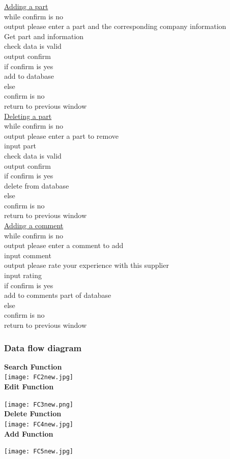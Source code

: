 \underline{Adding a part}\\
while confirm is no\\
output please enter a part and the corresponding company information\\
Get part and information\\
check data is valid\\
output confirm\\
if confirm is yes\\
add to database\\
else \\
confirm is no\\
return to previous window\\

\underline{Deleting a part}\\
while confirm is no\\
output please enter a part to remove\\
input part\\
check data is valid\\
output confirm\\
if confirm is yes\\
delete from database\\
else \\
confirm is no\\
return to previous window\\

\underline{Adding a comment}\\
while confirm is no\\
output please enter a comment to add\\
input comment\\
output please rate your experience with this supplier\\
input rating\\
if confirm is yes\\
add to comments part of database\\
else\\
confirm is no\\
return to previous window\\

\subsubsection{Data flow diagram}
\begin{flushleft}
\textbf{Search Function}\\
\texttt{[image: FC2new.jpg]}\\
\clearpage
\textbf{Edit Function}\\\par
\texttt{[image: FC3new.png]}\\
\textbf{Delete Function}\\
\texttt{[image: FC4new.jpg]}\\
\textbf{Add Function}\\\par
\texttt{[image: FC5new.jpg]}\\
\end{flushleft}
\clearpage

